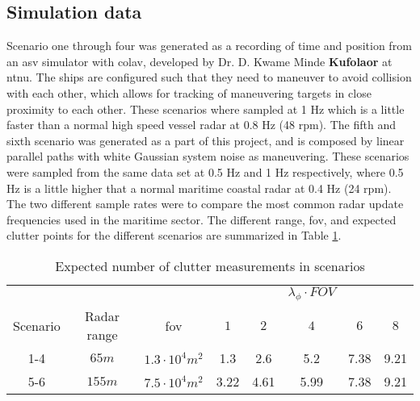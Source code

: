 \subsection{Simulation data}
Scenario one through four was generated as a recording of time and position from an \gls{asv} simulator with \gls{colav}, developed by Dr. D. Kwame Minde  \textbf{Kufolaor} at \gls{ntnu}. The ships are configured such that they need to maneuver to avoid collision with each other, which allows for tracking of maneuvering targets in close proximity to each other. These scenarios where sampled at 1 Hz which is a little faster than a normal high speed vessel \gls{radar} at 0.8 Hz (48 \gls{rpm}). The fifth and sixth scenario was generated as a part of this project, and is composed by linear parallel paths with white Gaussian system noise as maneuvering. These scenarios were sampled from the same data set at 0.5 Hz  and 1 Hz respectively, where 0.5 Hz is a little higher that a normal maritime coastal \gls{radar} at 0.4 Hz (24 \gls{rpm}). The two different sample rates were to compare the most common \gls{radar} update frequencies used in the maritime sector. The different range, \gls{fov}, and expected clutter points for the different scenarios are summarized in Table \ref{tab:clutter_measurements}.

\begin{table}
\centering
\begin{tabular}{c c c c c c c c}
			&				&						& & &$\lambda_\phi \cdot FOV$& 	&		\\
Scenario 	& Radar range	& \gls{fov}				& $1$ 	& $2$ 	& $4$ 	&$6$ 	& $8$	\\ \hline
1-4		 	& $65 m$ 		& $1.3\cdot10^4 m^2$	& 1.3 	& 2.6 	& 5.2 	& 7.38 	& 9.21 	\\
5-6		 	& $155 m$		& $7.5\cdot10^4 m^2$	& 3.22 	& 4.61 	& 5.99 	& 7.38 	& 9.21 					
\end{tabular}
\caption{Expected number of clutter measurements in scenarios}
\label{tab:clutter_measurements}
\end{table}

